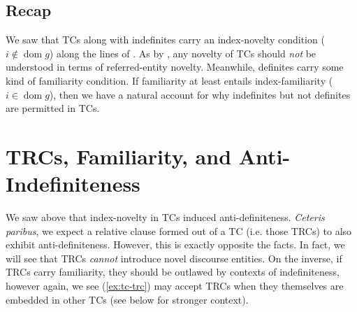 \documentclass[11pt]{article}
\DeclareMathOperator{\dom}{dom}
\begin{document}
\begin{exe}
	\label{ex:thereless-existential-be}
	\label{ex:creature}
	\label{ex:let-it-be}
\end{exe}


\subsection{Recap}
We saw that TCs along with indefinites carry an index-novelty condition (\(i \not\in \dom g\)) along the lines of \citet{heimSemanticsDefiniteIndefinite1982, mcnallyInterpretationEnglishExistential1992}. As by \citet{abbottDefinitenessExistentials1997}, any novelty of TCs should \textit{not} be understood in terms of referred-entity novelty. Meanwhile, definites carry some kind of familiarity condition. If familiarity at least entails index-familiarity (\(i \in \dom g\)), then we have a natural account for why indefinites but not definites are permitted in TCs.


\section{TRCs, Familiarity, and Anti-Indefiniteness}
We saw above that index-novelty in TCs induced anti-definiteness. \textit{Ceteris paribus}, we expect a relative clause formed out of a TC (i.e. those TRCs) to also exhibit anti-definiteness. However, this is exactly opposite the facts. In fact, we will see that TRCs \textit{cannot} introduce novel discourse entities. On the inverse, if TRCs carry familiarity, they should be outlawed by contexts of indefiniteness, however again, we see (\ref{ex:tc-trc}) may accept TRCs when they themselves are embedded in other TCs (see below for stronger context).

\begin{exe}
	\label{ex:trc:def}
	\label{ex:tc-trc}
\end{exe}
\end{document}
